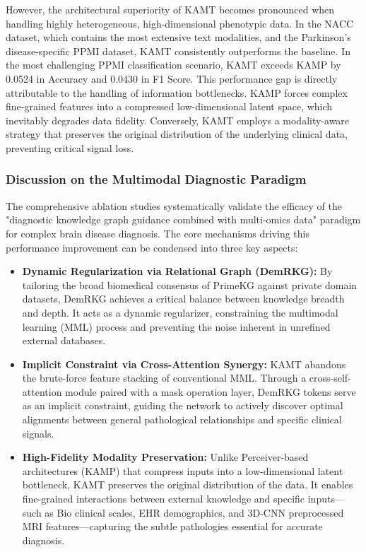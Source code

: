 \documentclass[lettersize,journal]{IEEEtran}
\begin{document}
However, the architectural superiority of KAMT becomes pronounced when handling highly heterogeneous, high-dimensional phenotypic data. In the NACC dataset, which contains the most extensive text modalities, and the Parkinson's disease-specific PPMI dataset, KAMT consistently outperforms the baseline. In the most challenging PPMI classification scenario, KAMT exceeds KAMP by 0.0524 in Accuracy and 0.0430 in F1 Score. This performance gap is directly attributable to the handling of information bottlenecks. KAMP forces complex fine-grained features into a compressed low-dimensional latent space, which inevitably degrades data fidelity. Conversely, KAMT employs a modality-aware strategy that preserves the original distribution of the underlying clinical data, preventing critical signal loss.

\subsubsection{Discussion on the Multimodal Diagnostic Paradigm}
The comprehensive ablation studies systematically validate the efficacy of the "diagnostic knowledge graph guidance combined with multi-omics data" paradigm for complex brain disease diagnosis. The core mechanisms driving this performance improvement can be condensed into three key aspects:

\begin{itemize}
    \item \textbf{Dynamic Regularization via Relational Graph (DemRKG):} By tailoring the broad biomedical consensus of PrimeKG against private domain datasets, DemRKG achieves a critical balance between knowledge breadth and depth. It acts as a dynamic regularizer, constraining the multimodal learning (MML) process and preventing the noise inherent in unrefined external databases.
    
    \item \textbf{Implicit Constraint via Cross-Attention Synergy:} KAMT abandons the brute-force feature stacking of conventional MML. Through a cross-self-attention module paired with a mask operation layer, DemRKG tokens serve as an implicit constraint, guiding the network to actively discover optimal alignments between general pathological relationships and specific clinical signals.
    
    \item \textbf{High-Fidelity Modality Preservation:} Unlike Perceiver-based architectures (KAMP) that compress inputs into a low-dimensional latent bottleneck, KAMT preserves the original distribution of the data. It enables fine-grained interactions between external knowledge and specific inputs—such as Bio clinical scales, EHR demographics, and 3D-CNN preprocessed MRI features—capturing the subtle pathologies essential for accurate diagnosis.
\end{itemize}
\end{document}
